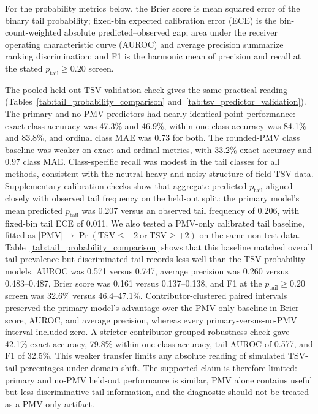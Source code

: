 For the probability metrics below, the Brier score is mean squared error of the binary tail probability; fixed-bin expected calibration error (ECE) is the bin-count-weighted absolute predicted--observed gap; area under the receiver operating characteristic curve (AUROC) and average precision summarize ranking discrimination; and F1 is the harmonic mean of precision and recall at the stated $p_{\mathrm{tail}}\ge0.20$ screen.

The pooled held-out TSV validation check gives the same practical reading (Tables~\ref{tab:tail_probability_comparison} and~\ref{tab:tsv_predictor_validation}). The primary and no-PMV predictors had nearly identical point performance: exact-class accuracy was 47.3\% and 46.9\%, within-one-class accuracy was 84.1\% and 83.8\%, and ordinal class MAE was 0.73 for both. The rounded-PMV class baseline was weaker on exact and ordinal metrics, with 33.2\% exact accuracy and 0.97 class MAE. Class-specific recall was modest in the tail classes for all methods, consistent with the neutral-heavy and noisy structure of field TSV data. Supplementary calibration checks show that aggregate predicted $p_{\mathrm{tail}}$ aligned closely with observed tail frequency on the held-out split: the primary model's mean predicted $p_{\mathrm{tail}}$ was 0.207 versus an observed tail frequency of 0.206, with fixed-bin tail ECE of 0.011. We also tested a PMV-only calibrated tail baseline, fitted as $|\mathrm{PMV}|\rightarrow\Pr(\mathrm{TSV}\le-2\ \mathrm{or}\ \mathrm{TSV}\ge+2)$ on the same non-test data. Table~\ref{tab:tail_probability_comparison} shows that this baseline matched overall tail prevalence but discriminated tail records less well than the TSV probability models. AUROC was 0.571 versus 0.747, average precision was 0.260 versus 0.483--0.487, Brier score was 0.161 versus 0.137--0.138, and F1 at the $p_{\mathrm{tail}}\ge0.20$ screen was 32.6\% versus 46.4--47.1\%. Contributor-clustered paired intervals preserved the primary model's advantage over the PMV-only baseline in Brier score, AUROC, and average precision, whereas every primary-versus-no-PMV interval included zero. A stricter contributor-grouped robustness check gave 42.1\% exact accuracy, 79.8\% within-one-class accuracy, tail AUROC of 0.577, and F1 of 32.5\%. This weaker transfer limits any absolute reading of simulated TSV-tail percentages under domain shift. The supported claim is therefore limited: primary and no-PMV held-out performance is similar, PMV alone contains useful but less discriminative tail information, and the diagnostic should not be treated as a PMV-only artifact.

